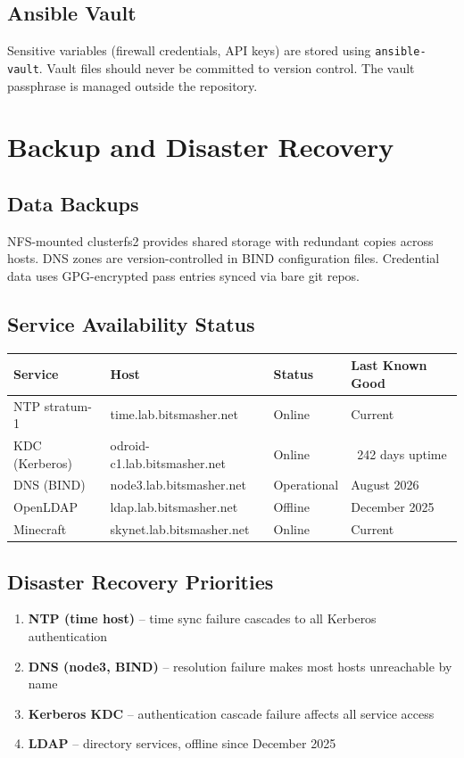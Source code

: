 \subsection{Ansible Vault}
Sensitive variables (firewall credentials, API keys) are stored using \texttt{ansible-vault}. Vault files should never be committed to version control. The vault passphrase is managed outside the repository.

\section{Backup and Disaster Recovery}

\subsection{Data Backups}
NFS-mounted clusterfs2 provides shared storage with redundant copies across hosts. DNS zones are version-controlled in BIND configuration files. Credential data uses GPG-encrypted pass entries synced via bare git repos.

\subsection{Service Availability Status}

\begin{center}
\begin{tabular}{llll}
  \hline
  \textbf{Service} & \textbf{Host} & \textbf{Status} & \textbf{Last Known Good} \\ \hline
  NTP stratum-1 & time.lab.bitsmasher.net & Online & Current \\
  KDC (Kerberos) & odroid-c1.lab.bitsmasher.net & Online & ~242 days uptime \\
  DNS (BIND) & node3.lab.bitsmasher.net & Operational & August 2026 \\
  OpenLDAP & ldap.lab.bitsmasher.net & Offline & December 2025 \\
  Minecraft & skynet.lab.bitsmasher.net & Online & Current \\ \hline
\end{tabular}
\end{center}

\subsection{Disaster Recovery Priorities}
\begin{enumerate}
  \item \textbf{NTP (time host)} -- time sync failure cascades to all Kerberos authentication
  \item \textbf{DNS (node3, BIND)} -- resolution failure makes most hosts unreachable by name
  \item \textbf{Kerberos KDC} -- authentication cascade failure affects all service access
  \item \textbf{LDAP} -- directory services, offline since December 2025
\end{enumerate}


